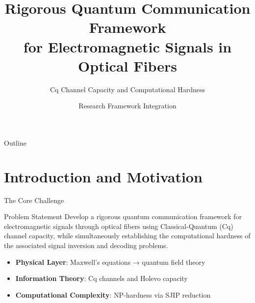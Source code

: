 \documentclass[10pt]{beamer}
\title{\textbf{Rigorous Quantum Communication Framework}\\
\textbf{for Electromagnetic Signals in Optical Fibers}}
\subtitle{Cq Channel Capacity and Computational Hardness}
\author{Research Framework Integration}
\date{}
\begin{document}
\begin{frame}
\titlepage
\end{frame}

\begin{frame}{Outline}
\tableofcontents
\end{frame}

\section{Introduction and Motivation}

\begin{frame}{The Core Challenge}
\begin{block}{Problem Statement}
Develop a rigorous quantum communication framework for electromagnetic signals through optical fibers using Classical-Quantum (Cq) channel capacity, while simultaneously establishing the computational hardness of the associated signal inversion and decoding problems.
\end{block}

\begin{itemize}
\item \textbf{Physical Layer}: Maxwell's equations → quantum field theory
\item \textbf{Information Theory}: Cq channels and Holevo capacity
\item \textbf{Computational Complexity}: NP-hardness via SJIP reduction
\end{itemize}
\end{frame}
\end{document}
